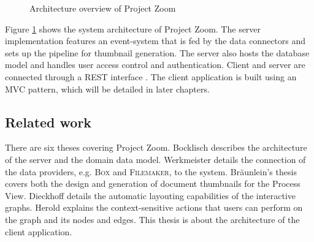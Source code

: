 \begin{figure}
\caption{Architecture overview of Project Zoom}
\label{fig:CompleteArchitectureDiagram}
\end{figure}

Figure \ref{fig:CompleteArchitectureDiagram} shows the system architecture of Project Zoom. The server implementation features an event-system that is fed by the data connectors and sets up the pipeline for thumbnail generation. The server also hosts the database model and handles user access control and authentication. Client and server are connected through a REST interface \cite{Fielding_2000}. The client application is built using an MVC pattern, which will be detailed in later chapters. 

\subsection{Related work}
There are six theses covering Project Zoom. Bocklisch \cite{Bocklisch_2013} describes the architecture of the server and the domain data model. Werkmeister \cite{Werkmeister_2013} details the connection of the data providers, e.g. \textsc{Box} and \textsc{Filemaker}, to the system. Bräunlein's thesis \cite{Braeunlein_2013} covers both the design and generation of document thumbnails for the Process View. Dieckhoff \cite{Dieckhoff_2013} details the automatic layouting capabilities of the interactive graphs. Herold \cite{Herold_2013} explains the context-sensitive actions that users can perform on the graph and its nodes and edges. This thesis is about the architecture of the client application.

